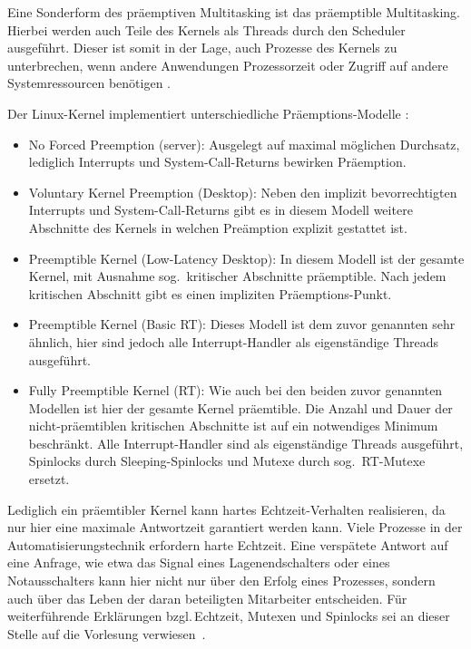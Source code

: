 Eine Sonderform des präemptiven Multitasking ist das präemptible Multitasking. Hierbei werden auch Teile 
des Kernels als Threads durch den Scheduler ausgeführt. Dieser ist somit in der Lage, auch Prozesse des Kernels
zu unterbrechen, wenn andere Anwendungen Prozessorzeit oder Zugriff auf andere Systemressourcen benötigen
\citep[vgl.][]{web-wiki-praempt}.
     
Der Linux-Kernel implementiert unterschiedliche Präemptions-Modelle \citep[vgl.][/preemption\_models]{web-linuxwiki-basics}:

\begin{itemize}
  \item No Forced Preemption (server):
  Ausgelegt auf maximal möglichen Durchsatz, lediglich Interrupts und
  System-Call-Returns bewirken Präemption.

  \item Voluntary Kernel Preemption (Desktop):
  Neben den implizit bevorrechtigten Interrupts und System-Call-Returns gibt es
  in diesem Modell weitere Abschnitte des Kernels in welchen Preämption explizit
  gestattet ist.

  \item Preemptible Kernel (Low-Latency Desktop):
  In diesem Modell ist der gesamte Kernel, mit Ausnahme sog.~kritischer Abschnitte
  präemptible. Nach jedem kritischen Abschnitt gibt es einen impliziten Präemptions-Punkt.

  \item Preemptible Kernel (Basic RT):
  Dieses Modell ist dem zuvor genannten sehr ähnlich, hier sind jedoch alle Interrupt-Handler
  als eigenständige Threads ausgeführt.

  \item Fully Preemptible Kernel (RT):
  Wie auch bei den beiden zuvor genannten Modellen ist hier der gesamte Kernel
  präemtible. Die Anzahl und Dauer der nicht-präemtiblen kritischen Abschnitte
  ist auf ein notwendiges Minimum beschränkt. Alle Interrupt-Handler sind als
  eigenständige Threads ausgeführt, Spinlocks durch Sleeping-Spinlocks und Mutexe
  durch sog.~RT-Mutexe ersetzt.

\end{itemize}

Lediglich ein präemtibler Kernel kann hartes Echtzeit-Verhalten realisieren, 
da nur hier eine maximale Antwortzeit garantiert werden kann.
Viele Prozesse in der Automatisierungstechnik erfordern harte Echtzeit. 
Eine verspätete Antwort auf eine Anfrage, 
wie etwa das Signal eines Lagenendschalters oder eines Notausschalters kann hier nicht nur über
den Erfolg eines Prozesses, sondern auch über das Leben der daran beteiligten Mitarbeiter entscheiden.
Für weiterführende Erklärungen bzgl.\,Echtzeit, Mutexen und 
Spinlocks sei an dieser Stelle auf die Vorlesung verwiesen~\citep{script-peter}.


